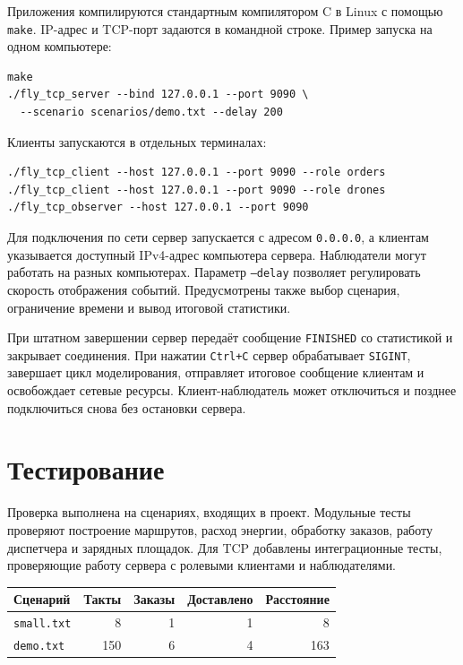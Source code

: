 \documentclass[12pt,a4paper]{article}
\begin{document}
Приложения компилируются стандартным компилятором C в Linux с помощью \texttt{make}. IP-адрес и TCP-порт задаются в командной строке. Пример запуска на одном компьютере:

\begin{lstlisting}
make
./fly_tcp_server --bind 127.0.0.1 --port 9090 \
  --scenario scenarios/demo.txt --delay 200
\end{lstlisting}

Клиенты запускаются в отдельных терминалах:

\begin{lstlisting}
./fly_tcp_client --host 127.0.0.1 --port 9090 --role orders
./fly_tcp_client --host 127.0.0.1 --port 9090 --role drones
./fly_tcp_observer --host 127.0.0.1 --port 9090
\end{lstlisting}

Для подключения по сети сервер запускается с адресом \texttt{0.0.0.0}, а клиентам указывается доступный IPv4-адрес компьютера сервера. Наблюдатели могут работать на разных компьютерах. Параметр \texttt{--delay} позволяет регулировать скорость отображения событий. Предусмотрены также выбор сценария, ограничение времени и вывод итоговой статистики.

При штатном завершении сервер передаёт сообщение \texttt{FINISHED} со статистикой и закрывает соединения. При нажатии \texttt{Ctrl+C} сервер обрабатывает \texttt{SIGINT}, завершает цикл моделирования, отправляет итоговое сообщение клиентам и освобождает сетевые ресурсы. Клиент-наблюдатель может отключиться и позднее подключиться снова без остановки сервера.

\section{Тестирование}

Проверка выполнена на сценариях, входящих в проект. Модульные тесты проверяют построение маршрутов, расход энергии, обработку заказов, работу диспетчера и зарядных площадок. Для TCP добавлены интеграционные тесты, проверяющие работу сервера с ролевыми клиентами и наблюдателями.

\begin{center}
\begin{tabular}{@{}lrrrr@{}}
\toprule
\textbf{Сценарий} & \textbf{Такты} & \textbf{Заказы} & \textbf{Доставлено} & \textbf{Расстояние}\\
\midrule
\texttt{small.txt} & 8 & 1 & 1 & 8\\
\texttt{demo.txt} & 150 & 6 & 4 & 163\\
\bottomrule
\end{tabular}
\end{center}
\end{document}

